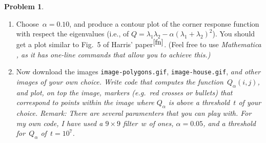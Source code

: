 \documentclass[11pt]{article}
\theoremstyle{plain}
\theoremstyle{definition}
\newtheorem{problem}{Problem}
\theoremstyle{remark}
\begin{document}
\begin{problem}
\begin{enumerate}[\bf(a)]
\item 
Choose~$\alpha=0.10$, and produce a contour plot of the corner response function with respect the eigenvalues
(i.e., of $Q=\lambda_1\lambda_2
-\alpha(\lambda_1+\lambda_2)^2$). You should get a plot 
similar to Fig.~5 of Harris' paper$^{\ref{fn}}$.
(Feel free to use \em Mathematica \em\/, as it
has one-line commands that allow you to achieve this.)
\item Now download the images \verb|image-polygons.gif|, \verb|image-house.gif|, \em and \em 
other images of your own choice. Write code that 
computes the function~$Q_\alpha(i,j)$, and plot, on top the image,
markers (e.g.~red crosses or bullets) that correspond to points within the image where
$Q_\alpha$ is above a threshold~$t$ of your choice. 
{\em Remark:} There are several paramenters that you
can play with. For my own code, I have used a $9\times 9$
filter~$w$ of ones, $\alpha =0.05$, and a threshold for~$Q_\alpha$ of~$t=10^7$.
\end{enumerate}
\end{problem}
\end{document}
